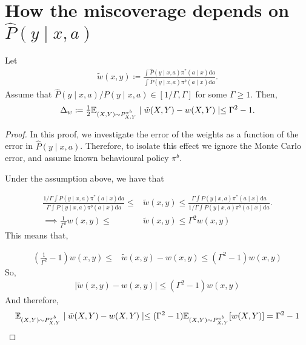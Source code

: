 \section{How the miscoverage depends on $\hat{P}(y\mid x, a)$}
\begin{proposition}
Let
\begin{align*}
    \tilde{w}(x, y) \coloneqq \frac{\int \hat{P}(y\mid x, a)\pi^*(a\mid x)\mathrm{d}a}{\int \hat{P}(y\mid x, a)\pi^b(a\mid x)\mathrm{d}a}.
\end{align*}
Assume that
$\hat{P}(y\mid x, a)/P(y\mid x, a) \in [1/\Gamma, \Gamma]$ for some $\Gamma \geq 1$.
Then, $$\Delta_w \coloneqq \tfrac{1}{2}\mathbb{E}_{(X,Y)\sim P^{\pi^b}_{X,Y}} \mid \tilde{w}(X,Y) - w(X,Y)\mid \leq \Gamma^2 - 1.$$
\end{proposition}
\begin{proof}
In this proof, we investigate the error of the weights as a function of the error in $\hat{P}(y\mid x, a)$. Therefore, to isolate this effect we ignore the Monte Carlo error, and assume known behavioural policy $\pi^b$.

Under the assumption above, we have that

\begin{align*}
    \frac{1/ \Gamma \int P(y\mid x, a)\pi^*(a\mid x)\mathrm{d}a}{\Gamma \int P(y\mid x, a)\pi^b(a\mid x)\mathrm{d}a} \leq &\tilde{w}(x, y) \leq \frac{\Gamma \int P(y\mid x, a)\pi^*(a\mid x)\mathrm{d}a}{1/\Gamma \int P(y\mid x, a)\pi^b(a\mid x)\mathrm{d}a}.\\
    \implies \frac{1}{\Gamma^2} w(x, y) \leq &\tilde{w}(x, y) \leq \Gamma^2 w(x, y)
\end{align*}
This means that, 

\begin{align*}
    \left(\frac{1}{\Gamma^2}-1 \right) w(x, y) \leq &\tilde{w}(x, y) - w(x, y) \leq (\Gamma^2 - 1) w(x, y)
\end{align*}
So, 
\begin{align*}
    \mid \tilde{w}(x, y) - w(x, y)\mid \leq (\Gamma^2 - 1) w(x, y)
\end{align*}
And therefore, 
\begin{align*}
    \mathbb{E}_{(X,Y)\sim P^{\pi^b}_{X,Y}} \mid \tilde{w}(X,Y) - w(X,Y)\mid \leq (\Gamma^2 - 1) \mathbb{E}_{(X,Y)\sim P^{\pi^b}_{X,Y}}[w(X, Y)] = \Gamma^2 - 1
\end{align*}
\end{proof}

%
